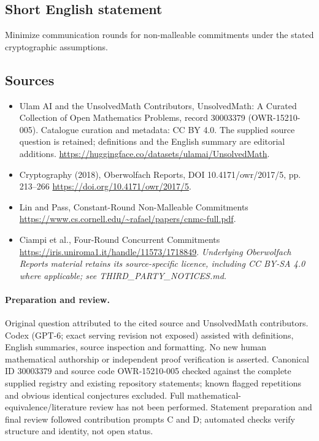 \documentclass[11pt]{article}
\begin{document}
\subsection{Short English statement}
Minimize communication rounds for non-malleable commitments under the stated cryptographic assumptions.
\subsection{Sources}
\begin{itemize}
\item[\hypertarget{source:30003379:1}{S1}] Ulam AI and the UnsolvedMath Contributors, UnsolvedMath: A Curated Collection of Open Mathematics Problems, record 30003379 (OWR-15210-005). Catalogue curation and metadata: CC BY 4.0. The supplied source question is retained; definitions and the English summary are editorial additions.
\url{https://huggingface.co/datasets/ulamai/UnsolvedMath}.
\item[\hypertarget{source:30003379:2}{S2}] Cryptography (2018), Oberwolfach Reports, DOI 10.4171/owr/2017/5, pp. 213--266
\url{https://doi.org/10.4171/owr/2017/5}.
\item[\hypertarget{source:30003379:3}{S3}] Lin and Pass, Constant-Round Non-Malleable Commitments
\url{https://www.cs.cornell.edu/~rafael/papers/cnmc-full.pdf}.
\item[\hypertarget{source:30003379:4}{S4}] Ciampi et al., Four-Round Concurrent Commitments
\url{https://iris.uniroma1.it/handle/11573/1718849}.
\textit{Underlying Oberwolfach Reports material retains its source-specific licence, including CC BY-SA 4.0 where applicable; see THIRD\_PARTY\_NOTICES.md.}
\end{itemize}
\paragraph{Preparation and review.}
Original question attributed to the cited source and UnsolvedMath contributors. Codex (GPT-6; exact serving revision not exposed) assisted with definitions, English summaries, source inspection and formatting. No new human mathematical authorship or independent proof verification is asserted. Canonical ID 30003379 and source code OWR-15210-005 checked against the complete supplied registry and existing repository statements; known flagged repetitions and obvious identical conjectures excluded. Full mathematical-equivalence/literature review has not been performed. Statement preparation and final review followed contribution prompts C and D; automated checks verify structure and identity, not open status.
\label{end:30003379}
\end{document}
